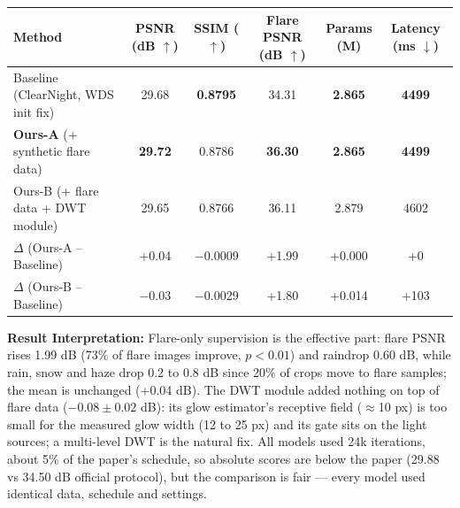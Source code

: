 \documentclass[8pt,a4paper]{article}
\begin{document}
\begin{center}


\label{tab:results}

\small

\begin{tabularx}{\linewidth}{
    @{}X c c c c c@{}
}

\toprule

\textbf{Method}
&
\makecell{\textbf{PSNR}\\(dB $\uparrow$)}
&
\makecell{\textbf{SSIM}\\($\uparrow$)}
&
\makecell{\textbf{Flare PSNR}\\(dB $\uparrow$)}
&
\makecell{\textbf{Params}\\(M)}
&
\makecell{\textbf{Latency}\\(ms $\downarrow$)}
\\

\midrule

Baseline (ClearNight, WDS init fix)
&
29.68
&
\textbf{0.8795}
&
34.31
&
\textbf{2.865}
&
\textbf{4499}
\\

\textbf{Ours-A} (+ synthetic flare data)
&
\textbf{29.72}
&
0.8786
&
\textbf{36.30}
&
\textbf{2.865}
&
\textbf{4499}
\\

Ours-B (+ flare data + DWT module)
&
29.65
&
0.8766
&
36.11
&
2.879
&
4602
\\

\midrule

$\Delta$ (Ours-A -- Baseline)
&
+0.04
&
$-$0.0009
&
+1.99
&
+0.000
&
+0
\\

$\Delta$ (Ours-B -- Baseline)
&
$-$0.03
&
$-$0.0029
&
+1.80
&
+0.014
&
+103
\\

\bottomrule

\end{tabularx}

\end{center}

\vspace{-5pt}

\textbf{Result Interpretation:}
Flare-only supervision is the effective part: flare PSNR rises 1.99 dB (73\% of flare images improve, $p<0.01$) and raindrop 0.60 dB, while rain, snow and haze drop 0.2 to 0.8 dB since 20\% of crops move to flare samples; the mean is unchanged (+0.04 dB). The DWT module added nothing on top of flare data ($-0.08 \pm 0.02$ dB): its glow estimator's receptive field ($\approx$10 px) is too small for the measured glow width (12 to 25 px) and its gate sits on the light sources; a multi-level DWT is the natural fix. All models used 24k iterations, about 5\% of the paper's schedule, so absolute scores are below the paper (29.88 vs 34.50 dB official protocol), but the comparison is fair — every model used identical data, schedule and settings.
\end{document}
